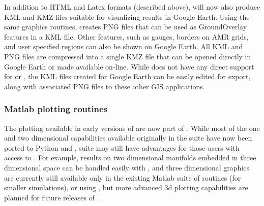 In addition to HTML and Latex formats (described above), \vclaw will now also
produce KML and KMZ files suitable for visualizing results in Google Earth.
Using the same \mplotlib graphics routines, \vclaw creates PNG files
that can be used as GroundOverlay features in a KML file.  Other features, such
as gauges, borders on AMR grids, and user specified regions can also be
shown on Google Earth.  All KML and PNG files are compressed into a single
KMZ file  that can be opened directly in Google Earth or made available on-line.
While \vclaw does not have any direct support for \agis or \qgis,
the  KML files created for Google Earth can be easily edited for
export, along with associated PNG files to these other GIS applications.

\subsubsection{Matlab plotting routines}
The \mlab plotting available in early versions of \cpack are now part
of \vclaw.  While most of the one and two dimensional capabilities
available originally in the \mlab suite have now been ported to Python
and \mplotlib, \mlab suite may still have advantages for those users
with access to \mlab.  For example, results on two dimensional
manifolds embedded in three dimensional space can be handled easily
with \vclaw, and three dimensional graphics are currently still
available only in the existing Matlab suite of routines (for smaller
simulations), or using \visit \cite{HPV:VisIt}, but more advanced 3d
plotting capabilities are planned for future releases of \cpack.
